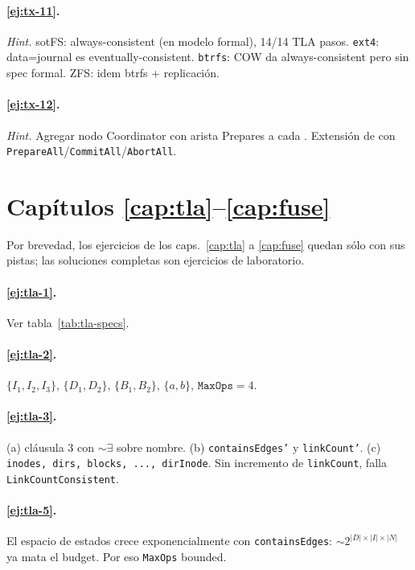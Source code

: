 \paragraph{\ref{ej:tx-11}.} \emph{Hint.} sotFS: always-consistent (en
modelo formal), 14/14 TLA pasos. \texttt{ext4}: data=journal es
eventually-consistent. \texttt{btrfs}: COW da always-consistent pero
sin spec formal. ZFS: idem btrfs + replicación.

\paragraph{\ref{ej:tx-12}.} \emph{Hint.} Agregar nodo
\textsf{Coordinator} con arista \textsf{Prepares} a cada \Txn{}.
Extensión de  con
\texttt{PrepareAll}/\texttt{CommitAll}/\texttt{AbortAll}.

\section*{Capítulos \ref{cap:tla}--\ref{cap:fuse}}

Por brevedad, los ejercicios de los caps.\ \ref{cap:tla} a \ref{cap:fuse}
quedan sólo con sus pistas; las soluciones completas son ejercicios de
laboratorio.

\paragraph{\ref{ej:tla-1}.} Ver tabla~\ref{tab:tla-specs}.

\paragraph{\ref{ej:tla-2}.} $\{I_1, I_2, I_3\}$, $\{D_1, D_2\}$,
$\{B_1, B_2\}$, $\{a, b\}$, $\texttt{MaxOps}=4$.

\paragraph{\ref{ej:tla-3}.} (a) cláusula 3 con $\sim\!\exists$ sobre
nombre. (b) \texttt{containsEdges'} y \texttt{linkCount'}. (c)
\texttt{inodes, dirs, blocks, ..., dirInode}. Sin incremento de
\texttt{linkCount}, falla \texttt{LinkCountConsistent}.

\paragraph{\ref{ej:tla-5}.} El espacio de estados crece exponencialmente
con \texttt{containsEdges}: $\sim 2^{|D| \times |I| \times |N|}$ ya
mata el budget. Por eso \texttt{MaxOps} bounded.

